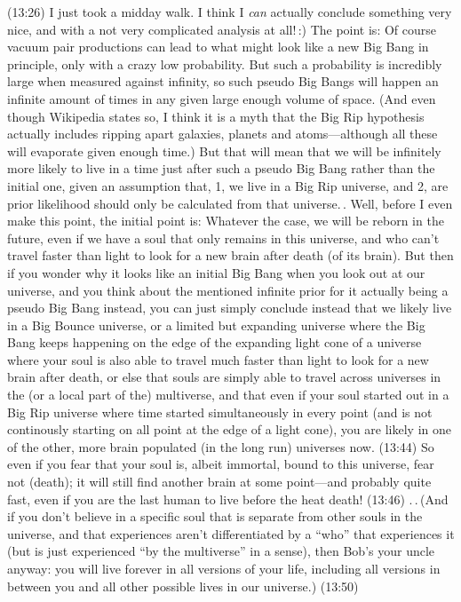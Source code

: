 \documentclass{report}
\begin{document}
(13:26) I just took a midday walk. I think I \emph{can} actually conclude something very nice, and with a not very complicated analysis at all!\,:) The point is: Of course vacuum pair productions can lead to what might look like a new Big Bang in principle, only with a crazy low probability. But such a probability is incredibly large when measured against infinity, so such pseudo Big Bangs will happen an infinite amount of times in any given large enough volume of space. (And even though Wikipedia states so, I think it is a myth that the Big Rip hypothesis actually includes ripping apart galaxies, planets and atoms---although all these will evaporate given enough time.) But that will mean that we will be infinitely more likely to live in a time just after such a pseudo Big Bang rather than the initial one, given an assumption that, 1, we live in a Big Rip universe, and 2, are prior likelihood should only be calculated from that universe.\,. Well, before I even make this point, the initial point is: Whatever the case, we will be reborn in the future, even if we have a soul that only remains in this universe, and who can't travel faster than light to look for a new brain after death (of its brain). But then if you wonder why it looks like an initial Big Bang when you look out at our universe, and you think about the mentioned infinite prior for it actually being a pseudo Big Bang instead, you can just simply conclude instead that we likely live in a Big Bounce universe, or a limited but expanding universe where the Big Bang keeps happening on the edge of the expanding light cone of a universe where your soul is also able to travel much faster than light to look for a new brain after death, or else that souls are simply able to travel across universes in the (or a local part of the) multiverse, and that even if your soul started out in a Big Rip universe where time started simultaneously in every point (and is not continously starting on all point at the edge of a light cone), you are likely in one of the other, more brain populated (in the long run) universes now. (13:44) So even if you fear that your soul is, albeit immortal, bound to this universe, fear not (death); it will still find another brain at some point---and probably quite fast, even if you are the last human to live before the heat death! (13:46) .\,.\,(And if you don't believe in a specific soul that is separate from other souls in the universe, and that experiences aren't differentiated by a ``who'' that experiences it (but is just experienced ``by the multiverse'' in a sense), then Bob's your uncle anyway: you will live forever in all versions of your life, including all versions in between you and all other possible lives in our universe.) (13:50)
\end{document}
